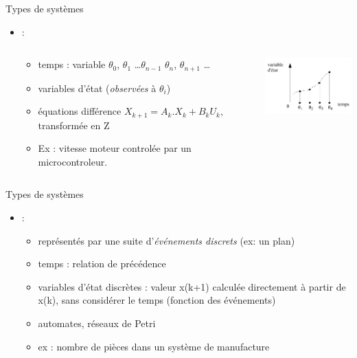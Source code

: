 \documentclass[compress]{beamer}
\begin{document}
\begin{frame}{Types de systèmes}
\begin{itemize} 
\item {} :
\begin{columns}
	\begin{column}{.7\textwidth}
		\begin{itemize}
		\item temps : variable  {\scriptsize $\theta_0$, $\theta_1$ \ldots $\theta_{n-1}$ $\theta_n$, $\theta_{n+1}$ \ldots}
		\item variables d'état  ({\it observées} à $\theta_i$)
		\item équations différence $X_{k+1}=A_k.X_k+B_kU_k$, transformée en Z
		\item Ex : vitesse moteur controlée par un microcontroleur.
		\end{itemize}
	\end{column}
	\begin{column}{.3\textwidth}
		\includegraphics[width=4cm]{echant}
	\end{column}
\end{columns}
\end{itemize}
\end{frame}

\begin{frame}{Types de systèmes}
\begin{itemize} 
\item {} :
	\begin{itemize}
	\item représentés par une suite d'{\it événements discrets} (ex: un plan)
	\item temps : relation de précédence
	\item variables d'état discrètes : valeur x(k+1) calculée directement à partir de x(k), sans considérer le temps (fonction des événements)
	\item automates, réseaux de Petri
	\item ex : nombre de pièces dans un système de manufacture
	\end{itemize}
\end{itemize}
\end{frame}
\end{document}

